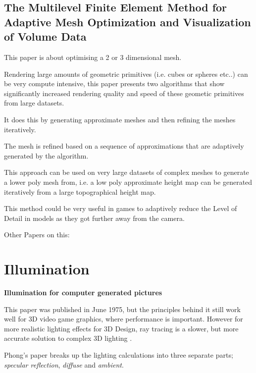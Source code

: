 \documentclass{scrartcl}
\begin{document}
\subsection{The Multilevel Finite Element Method for Adaptive Mesh
Optimization and Visualization of Volume Data}

\cite{grosso1997multilevel}
\par

This paper is about optimising a 2 or 3 dimensional mesh. 

Rendering large amounts  of geometric primitives (i.e. cubes or spheres etc..) can be very compute intensive, this paper presents two algorithms that show significantly increased rendering quality and speed of these geometic primitives from large datasets.

It does this by generating approximate meshes and then refining the meshes iteratively. 

The mesh is refined based on a sequence of approximations that are adaptively generated by the algorithm.

This approach can be used on very large datasets of complex meshes to generate a lower poly mesh from, i.e. a low poly approximate height map can be generated iteratively from a large topographical height map.

This method could be very useful in games to adaptively reduce the Level of Detail in models as they got further away from the camera.


Other Papers on this:
\cite{carey1981mesh}










\section{Illumination}
\textbf{Illumination for computer generated pictures \cite{phong1975illumination}}

This paper was published in June 1975, but the principles behind it still work well for 3D video game graphics, where performance is important. However for more realistic lighting effects for 3D Design, ray tracing is a slower, but more accurate solution to complex 3D lighting \cite{Shirley:2005:RayTracing}.

Phong's paper breaks up the lighting calculations into three separate parts; \textit{specular reflection}, \textit{diffuse} and \textit{ambient}.
\end{document}
